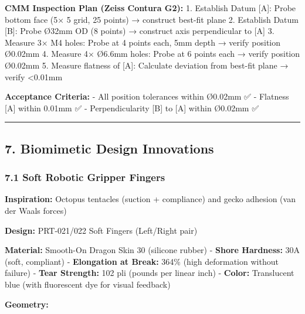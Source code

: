 \documentclass[
]{article}
\begin{document}
\textbf{CMM Inspection Plan (Zeiss Contura G2):} 1. Establish Datum
{[}A{]}: Probe bottom face (5× 5 grid, 25 points) → construct best-fit
plane 2. Establish Datum {[}B{]}: Probe Ø32mm OD (8 points) → construct
axis perpendicular to {[}A{]} 3. Measure 3× M4 holes: Probe at 4 points
each, 5mm depth → verify position Ø0.02mm 4. Measure 4× Ø6.6mm holes:
Probe at 6 points each → verify position Ø0.02mm 5. Measure flatness of
{[}A{]}: Calculate deviation from best-fit plane → verify
\textless0.01mm

\textbf{Acceptance Criteria:} - All position tolerances within Ø0.02mm
✅ - Flatness {[}A{]} within 0.01mm ✅ - Perpendicularity {[}B{]} to
{[}A{]} within Ø0.02mm ✅

\begin{center}\rule{0.5\linewidth}{0.5pt}\end{center}

\hypertarget{biomimetic-design-innovations}{%
\subsection{7. Biomimetic Design
Innovations}\label{biomimetic-design-innovations}}

\hypertarget{soft-robotic-gripper-fingers}{%
\subsubsection{7.1 Soft Robotic Gripper
Fingers}\label{soft-robotic-gripper-fingers}}

\textbf{Inspiration:} Octopus tentacles (suction + compliance) and gecko
adhesion (van der Waals forces)

\textbf{Design:} PRT-021/022 Soft Fingers (Left/Right pair)

\textbf{Material:} Smooth-On Dragon Skin 30 (silicone rubber) -
\textbf{Shore Hardness:} 30A (soft, compliant) - \textbf{Elongation at
Break:} 364\% (high deformation without failure) - \textbf{Tear
Strength:} 102 pli (pounds per linear inch) - \textbf{Color:}
Translucent blue (with fluorescent dye for visual feedback)

\textbf{Geometry:}
\end{document}
